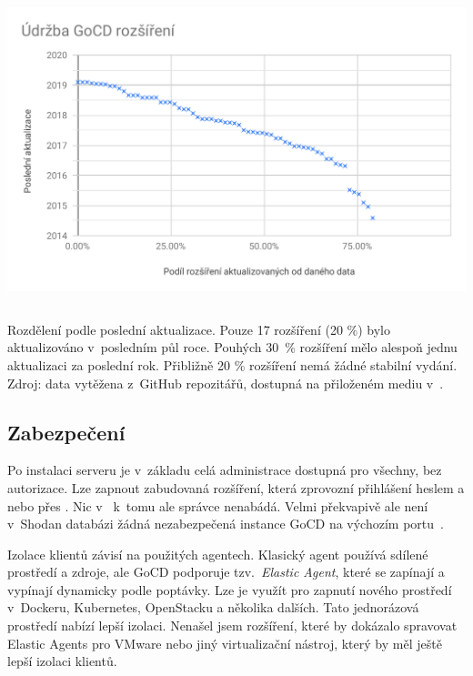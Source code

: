         \begin{iffigure}
            \centering
            \includegraphics[width=\textwidth,height=9cm,keepaspectratio]{media/go-plugins-update.pdf}
            \caption{Rozdělení podle poslední aktualizace. Pouze 17 rozšíření (20 \%) bylo aktualizováno v~posledním půl roce. Pouhých 30~\% rozšíření mělo alespoň jednu aktualizaci za poslední rok. Přibližně 20 \% rozšíření nemá žádné stabilní vydání. Zdroj: data vytěžena z~GitHub repozitářů, dostupná na přiloženém mediu v~.}
            \label{fig:jenkins-plugins}
        \end{iffigure}

    \newpage
    \subsection{Zabezpečení}
        Po instalaci serveru je v~základu celá administrace dostupná pro všechny, bez autorizace. Lze zapnout zabudovaná rozšíření, která zprovozní přihlášení heslem a nebo přes . Nic v~ k~tomu ale správce nenabádá. Velmi překvapivě ale není v~Shodan databázi žádná nezabezpečená instance GoCD na výchozím portu~\cite{shodan-gocd}.

        Izolace klientů závisí na použitých agentech. Klasický agent používá sdílené prostředí a zdroje, ale GoCD podporuje tzv.~\textit{Elastic Agent}, které se zapínají a vypínají dynamicky podle poptávky. Lze je využít pro zapnutí nového prostředí v~Dockeru, Kubernetes, OpenStacku a několika dalších. Tato jednorázová prostředí nabízí lepší izolaci. Nenašel jsem rozšíření, které by dokázalo spravovat Elastic Agents pro VMware nebo jiný virtualizační nástroj, který by měl ještě lepší izolaci klientů.

